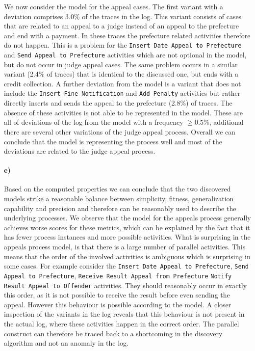 \documentclass[12pt]{report}
\begin{document}
We now consider the model for the appeal cases. The first variant with a deviation comprises 3.0\% of the traces in the log. This variant consists of cases that are related to an appeal to a judge instead of an appeal to the prefecture and end with a payment. In these traces the prefecture related activities therefore do not happen. This is a problem for the \texttt{Insert Date Appeal to Prefecture} and \texttt{Send Appeal to Prefecture} activities which are not optional in the model, but do not occur in judge appeal cases. The same problem occurs in a similar variant (2.4\% of traces) that is identical to the discussed one, but ends with a credit collection.
A further deviation from the model is a variant that does not include the \texttt{Insert Fine Notification} and \texttt{Add Penalty} activities but rather directly inserts and sends the appeal to the prefecture (2.8\%) of traces. The absence of these activities is not able to be represented in the model.
These are all of deviations of the log from the model with a frequency $\geq 0.5\%$, additional there are several other variations of the judge appeal process. Overall we can conclude that the model is representing the process well and most of the deviations are related to the judge appeal process.

\paragraph{\textbf{e)}}

Based on the computed properties we can conclude that the two discovered models strike a reasonable balance between simplicity, fitness, generalization capability and precision and therefore can be reasonably used to describe the underlying processes. We observe that the model for the appeals process generally achieves worse scores for these metrics, which can be explained by the fact that it has fewer process instances and more possible activities. What is surprising in the appeals process model, is that there is a large number of parallel activities. This means that the order of the involved activities is ambiguous which is surprising in some cases. For example consider the \texttt{Insert Date Appeal to Prefecture}, \texttt{Send Appeal to Prefecture}, \texttt{Receive Result Appeal from Prefecture} \texttt{Notify Result Appeal to Offender} activities. They should reasonably occur in exactly this order, as it is not possible to receive the result before even sending the appeal. However this behaviour is possible according to the model. A closer inspection of the variants in the log reveals that this behaviour is not present in the actual log, where these activities happen in the correct order. The parallel construct can therefore be traced back to a shortcoming in the discovery algorithm and not an anomaly in the log.
\end{document}
